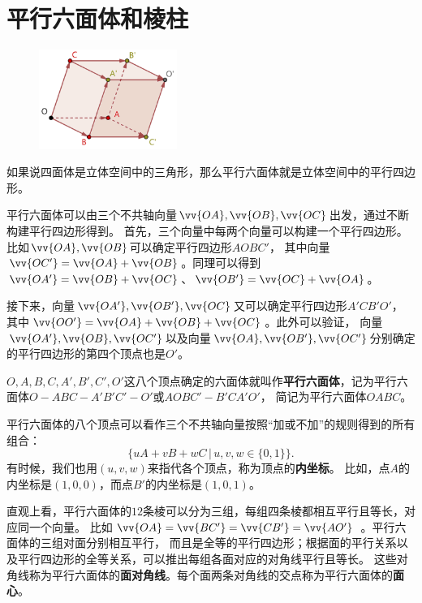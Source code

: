 \documentclass[12pt,UTF8]{ctexbook}
\begin{document}
\section{平行六面体和棱柱}

\begin{figure} %
    \vspace{-40pt}
    \flushright
    \includegraphics[width=0.4\textwidth]{tu/平行六面体1.png}
\end{figure}

如果说四面体是立体空间中的三角形，那么平行六面体就是立体空间中的平行四边形。

平行六面体可以由三个不共轴向量$\vv{OA},\vv{OB},\vv{OC}$出发，通过不断构建平行四边形得到。
首先，三个向量中每两个向量可以构建一个平行四边形。比如$\vv{OA},\vv{OB}$可以确定平行四边形$AOBC'$，
其中向量$\vv{OC'}=\vv{OA}+\vv{OB}$。同理可以得到$\vv{OA'}=\vv{OB}+\vv{OC}$、$\vv{OB'}=\vv{OC}+\vv{OA}$。

接下来，向量$\vv{OA'},\vv{OB'},\vv{OC}$又可以确定平行四边形$A'CB'O'$，
其中$\vv{OO'}=\vv{OA}+\vv{OB}+\vv{OC}$。此外可以验证，
向量$\vv{OA'},\vv{OB},\vv{OC'}$以及向量$\vv{OA},\vv{OB'},\vv{OC'}$分别确定的平行四边形的第四个顶点也是$O'$。

$O,A,B,C,A',B',C',O'$这八个顶点确定的六面体就叫作\textbf{平行六面体}，记为平行六面体$O-ABC-A'B'C'-O'$或$AOBC'-B'CA'O'$，
简记为平行六面体$OABC$。

平行六面体的八个顶点可以看作三个不共轴向量按照“加或不加”的规则得到的所有组合：
$$ \big\{uA+vB+wC \, | \, u,v,w\in\{0,1\}\big\}.$$
有时候，我们也用$(u,v,w)$来指代各个顶点，称为顶点的\textbf{内坐标}。
比如，点$A$的内坐标是$(1,0,0)$，而点$B'$的内坐标是$(1,0,1)$。

直观上看，平行六面体的$12$条棱可以分为三组，每组四条棱都相互平行且等长，对应同一个向量。
比如$\vv{OA} = \vv{BC'} = \vv{CB'} = \vv{AO'}$ 。平行六面体的三组对面分别相互平行，
而且是全等的平行四边形；根据面的平行关系以及平行四边形的全等关系，可以推出每组各面对应的对角线平行且等长。
这些对角线称为平行六面体的\textbf{面对角线}。每个面两条对角线的交点称为平行六面体的\textbf{面心}。
\end{document}
